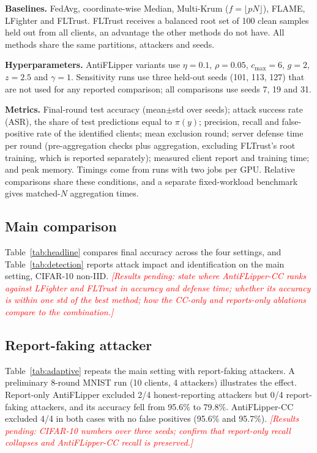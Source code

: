\documentclass[conference]{IEEEtran}
\newcommand{\pending}[1]{\textcolor{red}{\textit{[Results pending: #1]}}}
\begin{document}
\textbf{Baselines.} FedAvg, coordinate-wise Median, Multi-Krum ($f=\lfloor pN\rfloor$), FLAME, LFighter and FLTrust. FLTrust receives a balanced root set of 100 clean samples held out from all clients, an advantage the other methods do not have. All methods share the same partitions, attackers and seeds.

\textbf{Hyperparameters.} AntiFLipper variants use $\eta=0.1$, $\rho=0.05$, $c_{\max}=6$, $g=2$, $z=2.5$ and $\gamma=1$. Sensitivity runs use three held-out seeds (101, 113, 127) that are not used for any reported comparison; all comparisons use seeds 7, 19 and 31.

\textbf{Metrics.} Final-round test accuracy (mean$\pm$std over seeds); attack success rate (ASR), the share of test predictions equal to $\pi(y)$; precision, recall and false-positive rate of the identified clients; mean exclusion round; server defense time per round (pre-aggregation checks plus aggregation, excluding FLTrust's root training, which is reported separately); measured client report and training time; and peak memory. Timings come from runs with two jobs per GPU. Relative comparisons share these conditions, and a separate fixed-workload benchmark gives matched-$N$ aggregation times.

\subsection{Main comparison}
Table~\ref{tab:headline} compares final accuracy across the four settings, and Table~\ref{tab:detection} reports attack impact and identification on the main setting, CIFAR-10 non-IID.
\pending{state where AntiFLipper-CC ranks against LFighter and FLTrust in accuracy and defense time; whether its accuracy is within one std of the best method; how the CC-only and reports-only ablations compare to the combination.}



\subsection{Report-faking attacker}

Table~\ref{tab:adaptive} repeats the main setting with report-faking attackers. A preliminary 8-round MNIST run (10 clients, 4 attackers) illustrates the effect. Report-only AntiFLipper excluded 2/4 honest-reporting attackers but 0/4 report-faking attackers, and its accuracy fell from 95.6\% to 79.8\%. AntiFLipper-CC excluded 4/4 in both cases with no false positives (95.6\% and 95.7\%).
\pending{CIFAR-10 numbers over three seeds; confirm that report-only recall collapses and AntiFLipper-CC recall is preserved.}
\end{document}
